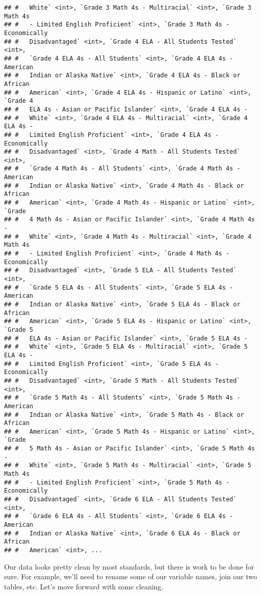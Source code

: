 \documentclass[]{article}
\begin{document}
\begin{verbatim}
## #   White` <int>, `Grade 3 Math 4s - Multiracial` <int>, `Grade 3 Math 4s
## #   - Limited English Proficient` <int>, `Grade 3 Math 4s - Economically
## #   Disadvantaged` <int>, `Grade 4 ELA - All Students Tested` <int>,
## #   `Grade 4 ELA 4s - All Students` <int>, `Grade 4 ELA 4s - American
## #   Indian or Alaska Native` <int>, `Grade 4 ELA 4s - Black or African
## #   American` <int>, `Grade 4 ELA 4s - Hispanic or Latino` <int>, `Grade 4
## #   ELA 4s - Asian or Pacific Islander` <int>, `Grade 4 ELA 4s -
## #   White` <int>, `Grade 4 ELA 4s - Multiracial` <int>, `Grade 4 ELA 4s -
## #   Limited English Proficient` <int>, `Grade 4 ELA 4s - Economically
## #   Disadvantaged` <int>, `Grade 4 Math - All Students Tested` <int>,
## #   `Grade 4 Math 4s - All Students` <int>, `Grade 4 Math 4s - American
## #   Indian or Alaska Native` <int>, `Grade 4 Math 4s - Black or African
## #   American` <int>, `Grade 4 Math 4s - Hispanic or Latino` <int>, `Grade
## #   4 Math 4s - Asian or Pacific Islander` <int>, `Grade 4 Math 4s -
## #   White` <int>, `Grade 4 Math 4s - Multiracial` <int>, `Grade 4 Math 4s
## #   - Limited English Proficient` <int>, `Grade 4 Math 4s - Economically
## #   Disadvantaged` <int>, `Grade 5 ELA - All Students Tested` <int>,
## #   `Grade 5 ELA 4s - All Students` <int>, `Grade 5 ELA 4s - American
## #   Indian or Alaska Native` <int>, `Grade 5 ELA 4s - Black or African
## #   American` <int>, `Grade 5 ELA 4s - Hispanic or Latino` <int>, `Grade 5
## #   ELA 4s - Asian or Pacific Islander` <int>, `Grade 5 ELA 4s -
## #   White` <int>, `Grade 5 ELA 4s - Multiracial` <int>, `Grade 5 ELA 4s -
## #   Limited English Proficient` <int>, `Grade 5 ELA 4s - Economically
## #   Disadvantaged` <int>, `Grade 5 Math - All Students Tested` <int>,
## #   `Grade 5 Math 4s - All Students` <int>, `Grade 5 Math 4s - American
## #   Indian or Alaska Native` <int>, `Grade 5 Math 4s - Black or African
## #   American` <int>, `Grade 5 Math 4s - Hispanic or Latino` <int>, `Grade
## #   5 Math 4s - Asian or Pacific Islander` <int>, `Grade 5 Math 4s -
## #   White` <int>, `Grade 5 Math 4s - Multiracial` <int>, `Grade 5 Math 4s
## #   - Limited English Proficient` <int>, `Grade 5 Math 4s - Economically
## #   Disadvantaged` <int>, `Grade 6 ELA - All Students Tested` <int>,
## #   `Grade 6 ELA 4s - All Students` <int>, `Grade 6 ELA 4s - American
## #   Indian or Alaska Native` <int>, `Grade 6 ELA 4s - Black or African
## #   American` <int>, ...
\end{verbatim}

Our data looks pretty clean by most standards, but there is work to be
done for sure. For example, we'll need to rename some of our variable
names, join our two tables, etc. Let's move forward with some cleaning.
\end{document}

